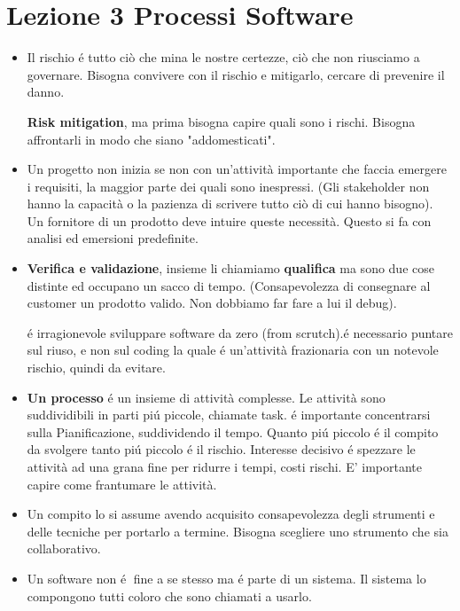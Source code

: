 \documentclass[a4paper,10pt] {article}
\begin{document}
\section{Lezione 3 Processi Software}
\begin{itemize}
	\item Il rischio é tutto ciò che mina le nostre certezze, ciò che non 
	riusciamo a governare. Bisogna convivere con
	il rischio e mitigarlo, cercare di prevenire il danno.
	
	\textbf{Risk mitigation}, ma prima bisogna capire quali sono i rischi.
	Bisogna affrontarli in modo che siano "addomesticati".
	
	
	\item Un progetto non inizia se non con un'attività importante che faccia 
	emergere i requisiti, la maggior parte dei quali sono inespressi. (Gli 
	stakeholder non hanno la capacità o la pazienza 
	di scrivere tutto ciò di cui hanno
	bisogno). Un fornitore di un prodotto deve intuire queste necessità. 
	Questo si fa con analisi ed emersioni predefinite.
	
	\item \textbf{Verifica e validazione}, insieme li chiamiamo 
	\textbf{qualifica} ma sono due cose distinte ed occupano un sacco di
	tempo. (Consapevolezza di consegnare al customer un prodotto valido. Non 
	dobbiamo far fare a lui il debug).
	
	é irragionevole sviluppare software da zero (from scrutch).é necessario 
	puntare sul riuso, e non sul coding la quale é un'attività frazionaria 
	con un notevole rischio, quindi da evitare.
	
	\item \textbf{Un processo} é un insieme di attività complesse. Le 
	attività sono suddividibili in parti pi\'u piccole, chiamate
	task. é importante concentrarsi sulla Pianificazione, suddividendo il 
	tempo.
	 Quanto pi\'u piccolo é il compito da svolgere tanto pi\'u
	piccolo é il rischio. Interesse decisivo é spezzare le attività ad 
	una grana fine per ridurre i tempi, costi rischi. E' importante capire come 
	frantumare le attività.  
	
	
	\item  Un compito lo si assume avendo acquisito consapevolezza degli 
	strumenti e delle tecniche per portarlo
	a termine. Bisogna scegliere uno strumento che sia collaborativo.
	
	\item Un software non é fine a se stesso ma é parte di un sistema. Il 
	sistema lo compongono tutti coloro che sono chiamati a usarlo. 
	

\end{itemize}
\end{document}

